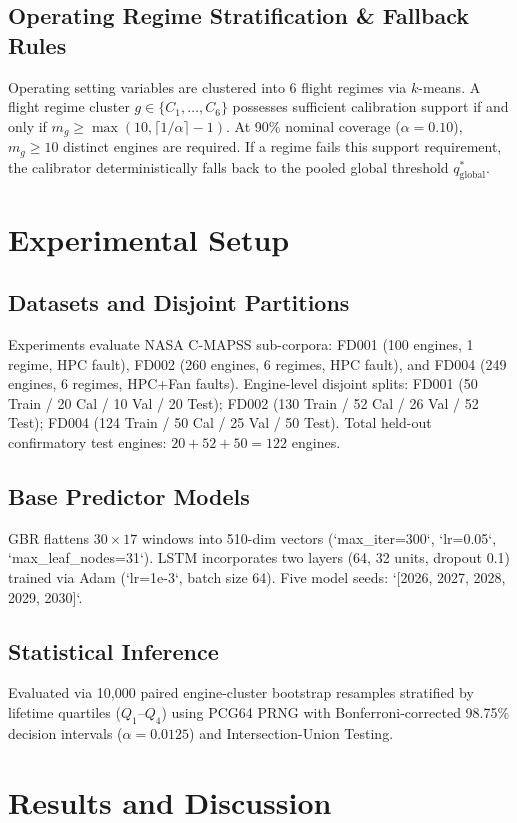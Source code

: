 \documentclass[conference,a4paper]{IEEEtran}
\begin{document}
\subsection{Operating Regime Stratification \& Fallback Rules}
Operating setting variables are clustered into 6 flight regimes via $k$-means. A flight regime cluster $g \in \{C_1, \dots, C_6\}$ possesses sufficient calibration support if and only if $m_g \ge \max(10, \lceil 1/\alpha \rceil - 1)$. At 90\% nominal coverage ($\alpha = 0.10$), $m_g \ge 10$ distinct engines are required. If a regime fails this support requirement, the calibrator deterministically falls back to the pooled global threshold $q^*_{\text{global}}$.

\section{Experimental Setup}

\subsection{Datasets and Disjoint Partitions}
Experiments evaluate NASA C-MAPSS sub-corpora: FD001 (100 engines, 1 regime, HPC fault), FD002 (260 engines, 6 regimes, HPC fault), and FD004 (249 engines, 6 regimes, HPC+Fan faults). Engine-level disjoint splits:
FD001 (50 Train / 20 Cal / 10 Val / 20 Test); FD002 (130 Train / 52 Cal / 26 Val / 52 Test); FD004 (124 Train / 50 Cal / 25 Val / 50 Test). Total held-out confirmatory test engines: $20 + 52 + 50 = 122$ engines.

\subsection{Base Predictor Models}
GBR flattens $30 \times 17$ windows into 510-dim vectors (`max_iter=300`, `lr=0.05`, `max_leaf_nodes=31`). LSTM incorporates two layers (64, 32 units, dropout 0.1) trained via Adam (`lr=1e-3`, batch size 64). Five model seeds: `[2026, 2027, 2028, 2029, 2030]`.

\subsection{Statistical Inference}
Evaluated via 10,000 paired engine-cluster bootstrap resamples stratified by lifetime quartiles ($Q_1$--$Q_4$) using PCG64 PRNG with Bonferroni-corrected 98.75\% decision intervals ($\alpha = 0.0125$) and Intersection-Union Testing.

\section{Results and Discussion}
\end{document}
